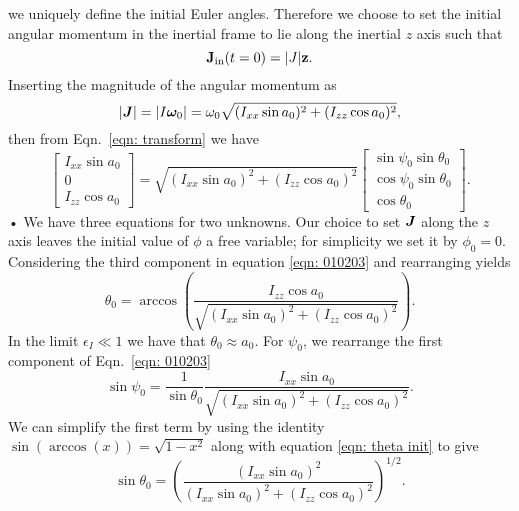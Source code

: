 \documentclass[../full_thesis/full_thesis.tex]{subfiles}
\begin{document}
we uniquely define the initial Euler angles. Therefore we choose to set the initial
angular momentum in the inertial frame to lie along the inertial $z$ axis such
that
\begin{equation}
  \mathbf{J}_{\textrm{in}}(t=0) = |J| \mathbf{z}.
\end{equation}
Inserting the magnitude of the angular momentum as
\begin{equation}
|\boldsymbol{J}| = |I \boldsymbol{\omega}_{0}|=\omega_{0}\sqrt{(I_{xx}\sin a_{0})^{2} + (I_{zz}\cos a_{0})^{2}},
\end{equation}
then from Eqn.~\eqref{eqn: transform} we have
\begin{equation}
\left[ \begin{array}{c}
I_{xx}\sin a_{0} \\
0 \\
I_{zz} \cos a_{0}
\end{array}\right] =
\sqrt{(I_{xx}\sin a_{0})^{2} + (I_{zz}\cos a_{0})^{2}}
\left[ \begin{array}{c}
\sin \psi_{0} \sin \theta_{0} \\
\cos \psi_{0} \sin \theta_{0} \\
\cos \theta_{0}
\end{array}\right].
\label{eqn: 010203}
\end{equation}•
We have three equations for two unknowns. Our choice to set $\boldsymbol{J}$ along
the $z$ axis leaves the initial value of $\phi$ a free variable; for simplicity
we set it by $\phi_{0} = 0$.
Considering the third component in equation \eqref{eqn: 010203} and rearranging
yields
\begin{equation}
\theta_{0} = \arccos\left(\frac{I_{zz}\cos a_{0}}{ \sqrt{(I_{xx}\sin
        a_{0})^{2} + (I_{zz}\cos a_{0})^{2}}} \right).
\label{eqn: theta init}
\end{equation}
In the limit $\epsilon_{I} \ll 1$ we have that $\theta_{0} \approx a_{0}$.
For $\psi_0$, we rearrange the first component of Eqn.~\eqref{eqn: 010203}
\begin{equation}
\sin\psi_{0} =\frac{1}{ \sin\theta_{0}}
\frac{ I_{xx}\sin a_{0}}{\sqrt{(I_{xx}\sin a_{0})^{2} + (I_{zz}\cos a_{0})^{2}}}.
\label{eqn: 8283}
\end{equation}
We can simplify the first term by using the identity $\sin(\arccos(x)) = \sqrt{1 - x^{2}}$
along with equation \eqref{eqn:  theta init} to give
\begin{equation}
\sin\theta_{0} = \left(\frac{(I_{xx}\sin a_{0})^{2}}
                  {(I_{xx}\sin a_{0})^{2} + (I_{zz}\cos a_{0})^{2}} \right)^{1/2}.
\end{equation}
\end{document}
